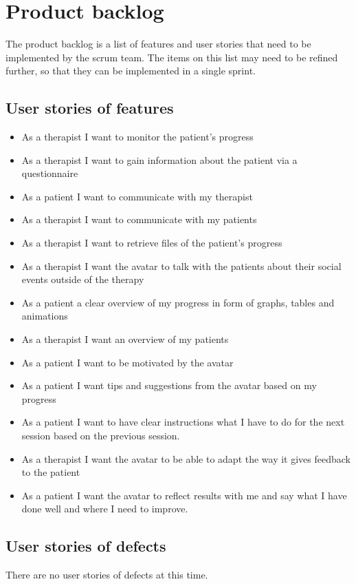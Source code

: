 \chapter{Product backlog}
The product backlog is a list of features and user stories that need to be implemented by the \gls{scrum} team. The items on this list may need to be refined further, so that they can be implemented in a single \gls{sprint}.

\section{User stories of features}
\begin{itemize}
\item As a therapist I want to monitor the patient's progress 
\item As a therapist I want to gain information about the patient via a questionnaire
\item As a patient I want to communicate with my therapist
\item As a therapist I want to communicate with my patients
\item As a therapist I want to retrieve files of the patient's progress
\item As a therapist I want the \gls{avatar} to talk with the patients about their social events outside of the therapy
\item As a patient a clear overview of my progress in form of graphs, tables and animations
\item As a therapist I want an overview of my patients 
\item As a patient I want to be motivated by the \gls{avatar}
\item As a patient I want tips and suggestions from the \gls{avatar} based on my progress
\item As a patient I want to have clear instructions what I have to do for the next session based on the previous session.
\item As a therapist I want the \gls{avatar} to be able to adapt the way it gives feedback to the patient
\item As a patient I want the \gls{avatar} to reflect results with me and say what I have done well and where I need to improve.
\end{itemize}
 
\section{User stories of defects}
There are no user stories of defects at this time.

